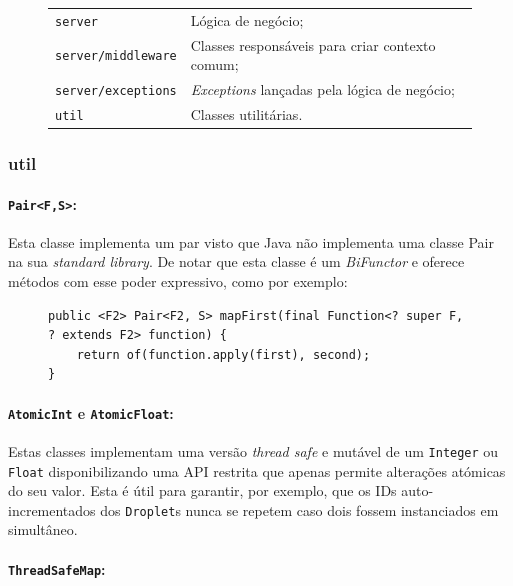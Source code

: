 \documentclass[a4paper]{article}
\begin{document}
\begin{figure}[H]
\centering
    \begin{tabular}{ll}
        \texttt{server}            & Lógica de negócio;\\
        \texttt{server/middleware} & Classes responsáveis para criar contexto comum;\\
        \texttt{server/exceptions} & \textit{Exceptions} lançadas pela lógica de negócio;\\
        \texttt{util}              & Classes utilitárias.
    \end{tabular}
\end{figure}

\subsubsection{util}
\paragraph{\texttt{Pair<F,S>}:}

Esta classe implementa um par visto que Java não implementa uma classe Pair na sua \textit{standard library}. De notar que esta classe é um \textit{BiFunctor} e oferece métodos com esse poder expressivo, como por exemplo:
\begin{figure}[H]
    \begin{verbatim}
public <F2> Pair<F2, S> mapFirst(final Function<? super F, ? extends F2> function) {
    return of(function.apply(first), second);
}
    \end{verbatim}
\end{figure}

\paragraph{\texttt{AtomicInt} e \texttt{AtomicFloat}:}

Estas classes implementam uma versão \textit{thread safe} e mutável de um \texttt{Integer} ou \texttt{Float} disponibilizando uma API restrita que apenas permite alterações atómicas do seu valor. Esta é útil para garantir, por exemplo,  que os IDs auto-incrementados dos \texttt{Droplet}s nunca se repetem  caso dois fossem instanciados em simultâneo.

\paragraph{\texttt{ThreadSafeMap}:}
\end{document}
